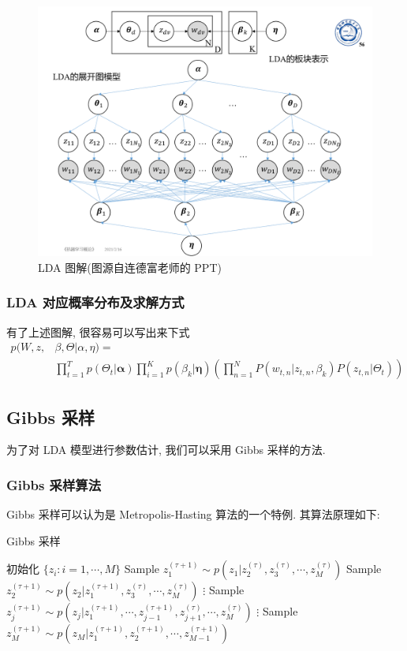 \documentclass[UTF8]{article}
\begin{document}
\begin{figure}[H]
	\centering
	\includegraphics[width=\linewidth/2]{image/lda_diagram.png}
	\caption{LDA 图解(图源自连德富老师的 PPT)}
\end{figure}
\subsubsection{LDA 对应概率分布及求解方式}
有了上述图解, 很容易可以写出来下式
\begin{align}
p(W,z,&\beta,\Theta|\alpha,\eta)=\\
&\prod\limits_{t=1}^Tp(\Theta_t|\bm{\alpha})\prod\limits_{i=1}^Kp(\beta_k|\bm{\eta})\left(\prod\limits_{n=1}^NP(w_{t,n}|z_{t,n},\beta_k)P(z_{t,n}|\Theta_t)\right)
\end{align}
\subsection{Gibbs 采样}
为了对 LDA 模型进行参数估计, 我们可以采用 Gibbs 采样的方法.
\subsubsection{Gibbs 采样算法}
Gibbs 采样可以认为是 Metropolis-Hasting 算法的一个特例. 其算法原理如下:\par
{\centering
\begin{minipage}{\linewidth*5/7}
\begin{algorithm}[H]
\caption{{\sc Gibbs 采样}}
	\begin{algorithmic}[1] %
	\State 初始化 $\{z_i: i=1,\cdots, M\}$
		\State Sample $z_1^{(\tau+1)}\sim p(z_1|z_2^{(\tau)},z_3^{(\tau)},\cdots, z_M^{(\tau)})$
		\State Sample $z_2^{(\tau+1)}\sim p(z_2|z_1^{(\tau+1)},z_3^{(\tau)},\cdots, z_M^{(\tau)})$
		\State $\vdots$
		\State Sample $z_j^{(\tau+1)}\sim
		p(z_j|z_1^{(\tau+1)},\cdots, z_{j-1}^{(\tau+1)},z_{j+1}^{(\tau)},\cdots, z_M^{(\tau)})$
		\State $\vdots$
		\State Sample $z_M^{(\tau+1)}\sim p(z_M|z_1^{(\tau+1)},z_2^{(\tau+1)},\cdots, z_{M-1}^{(\tau+1)})$
	\EndFor
	\end{algorithmic}
\end{algorithm}
\end{minipage}
\par}
\end{document}
